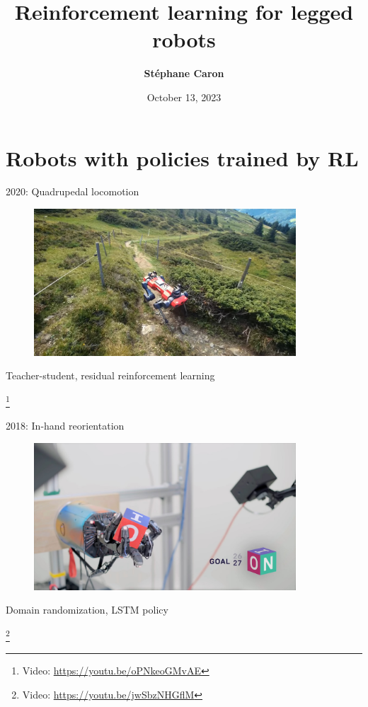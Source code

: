 \documentclass[11pt, aspectratio=169]{beamer}
\title{
    Reinforcement learning for legged robots
}
\author{\textbf{St\'ephane Caron}}
\date{October 13, 2023}
\institute{Inria--\'{E}cole normale sup\'{e}rieure}
\newcommand\blfootnote[1]{%
  \begingroup
  \renewcommand\thefootnote{}%
  \footnote{#1}%
  \addtocounter{footnote}{-1}%
  \endgroup
}
\begin{document}
\maketitle


\section*{Robots with policies trained by RL}

\begin{frame}{2020: Quadrupedal locomotion~\cite{lee2020}}
    \vspace{1.5em}
    \begin{figure}
        \includegraphics[height=5.5cm]{figures/hike-with-anymal.jpg}
    \end{figure}
    \begin{center}
        Teacher-student, residual reinforcement learning
    \end{center}
    \blfootnote{
        Video: \url{https://youtu.be/oPNkeoGMvAE}
    }
\end{frame}

\begin{frame}{2018: In-hand reorientation}
    \vspace{1.5em}
    \begin{figure}
        \includegraphics[height=5.5cm]{figures/in-hand-reorientation.jpg}
    \end{figure}
    \begin{center}
        Domain randomization, LSTM policy
    \end{center}
    \blfootnote{
        Video: \url{https://youtu.be/jwSbzNHGflM}
    }
\end{frame}
\end{document}
